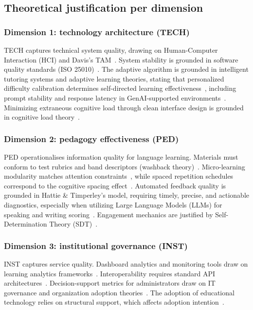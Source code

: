 \documentclass[11pt,a4paper]{article}
\begin{document}
\subsection{Theoretical justification per dimension}

\subsubsection{Dimension 1: technology architecture (TECH)}
TECH captures technical system quality, drawing on Human-Computer Interaction (HCI) and Davis's TAM~\cite{b11}. System stability is grounded in software quality standards (ISO 25010)~\cite{b14}. The adaptive algorithm is grounded in intelligent tutoring systems and adaptive learning theories, stating that personalized difficulty calibration determines self-directed learning effectiveness~\cite{b15}, including prompt stability and response latency in GenAI-supported environments~\cite{b37}\cite{b40}. Minimizing extraneous cognitive load through clean interface design is grounded in cognitive load theory~\cite{b16}.

\subsubsection{Dimension 2: pedagogy effectiveness (PED)}
PED operationalises information quality for language learning. Materials must conform to test rubrics and band descriptors (washback theory)~\cite{b21}. Micro-learning modularity matches attention constraints~\cite{b22}, while spaced repetition schedules correspond to the cognitive spacing effect~\cite{b23}. Automated feedback quality is grounded in Hattie \& Timperley's model, requiring timely, precise, and actionable diagnostics, especially when utilizing Large Language Models (LLMs) for speaking and writing scoring~\cite{b17}\cite{b38}\cite{b39}. Engagement mechanics are justified by Self-Determination Theory (SDT)~\cite{b12}.

\subsubsection{Dimension 3: institutional governance (INST)}
INST captures service quality. Dashboard analytics and monitoring tools draw on learning analytics frameworks~\cite{b9}. Interoperability requires standard API architectures~\cite{b26}. Decision-support metrics for administrators draw on IT governance and organization adoption theories~\cite{b18}. The adoption of educational technology relies on structural support, which affects adoption intention~\cite{b28}\cite{b29}.
\end{document}
